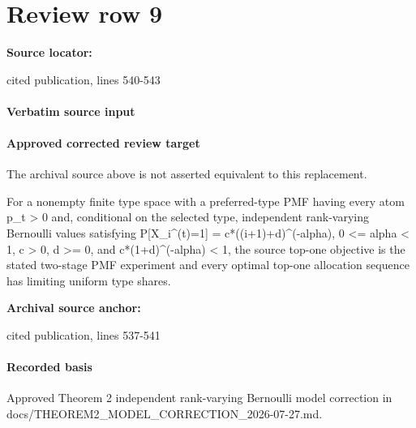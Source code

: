 \documentclass[10pt]{article}
\begin{document}
\section*{Review row 9}
\textbf{Source locator:} {\footnotesize\raggedright cited publication, lines 540-\allowbreak{}543\par}
\paragraph{Verbatim source input}
\begin{ReviewVerbatim}
\end{ReviewVerbatim}

\paragraph{Approved corrected review target}
The archival source above is not asserted equivalent to this replacement.
\begin{ReviewVerbatim}
For a nonempty finite type space with a preferred-type PMF having every atom p_t > 0 and, conditional on the selected type, independent rank-varying Bernoulli values satisfying P[X_i^(t)=1] = c*((i+1)+d)^(-alpha), 0 <= alpha < 1, c > 0, d >= 0, and c*(1+d)^(-alpha) < 1, the source top-one objective is the stated two-stage PMF experiment and every optimal top-one allocation sequence has limiting uniform type shares.
\end{ReviewVerbatim}

\textbf{Archival source anchor:} {\footnotesize\raggedright cited publication, lines 537-\allowbreak{}541\par}
\paragraph{Recorded basis}
Approved Theorem 2 independent rank-\allowbreak{}varying Bernoulli model correction in docs/\allowbreak{}THEOREM2\_\allowbreak{}MODEL\_\allowbreak{}CORRECTION\_\allowbreak{}2026-\allowbreak{}07-\allowbreak{}27.\allowbreak{}md.\allowbreak{}
\end{document}
